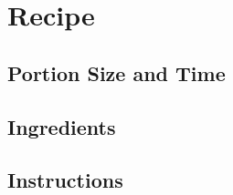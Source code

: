 \documentclass{article}
\author{}
\title{}
\date{6\textsuperscript{th} June 2016}%
\begin{document}
    \maketitle   
    \section{Recipe}
        \subsection{Portion Size and Time}
            \begin{itemize}
                
            \end{itemize}
        \subsection{Ingredients}
              
        \subsection{Instructions}
        \begin{enumerate}
            \end{enumerate}
    
       
\end{document}
